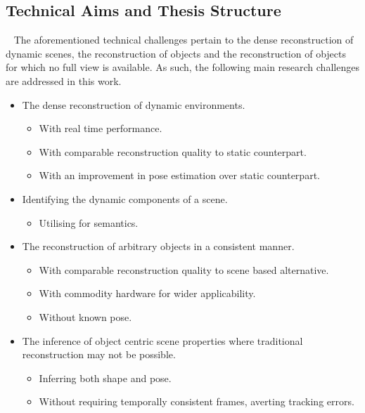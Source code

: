 \subsection{Technical Aims and Thesis Structure}
~\label{subsec:intro_aims_structure}
The aforementioned technical challenges pertain to the dense reconstruction of dynamic scenes, the 
reconstruction of objects and the reconstruction of objects for which no full view is available. As 
such, the following main research challenges are addressed in this work.
\begin{itemize}
  \item The dense reconstruction of dynamic environments.
  \begin{itemize}
    \item With real time performance.
    \item With comparable reconstruction quality to static counterpart.
    \item With an improvement in pose estimation over static counterpart.
  \end{itemize}
  \item Identifying the dynamic components of a scene.
  \begin{itemize}
    \item Utilising for semantics.
  \end{itemize}
  \item The reconstruction of arbitrary objects in a consistent manner.
  \begin{itemize}
    \item With comparable reconstruction quality to scene based alternative.
    \item With commodity hardware for wider applicability.
    \item Without known pose.
  \end{itemize}
  \item The inference of object centric scene properties where traditional reconstruction 
may not be possible.
  \begin{itemize}
    \item Inferring both shape and pose.
    \item Without requiring temporally consistent frames, averting tracking errors.
  \end{itemize}
\end{itemize}

